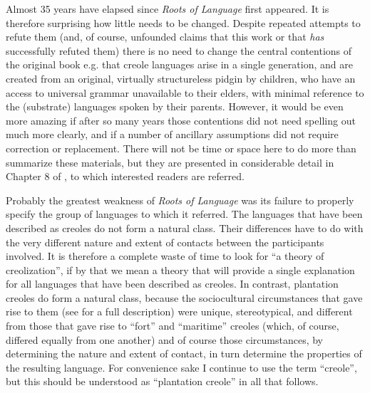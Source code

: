 
Almost 35 years have elapsed since \textit{Roots of Language} first appeared. It is therefore surprising how little needs to be changed. Despite repeated attempts to refute them (and, of course, unfounded claims that this work or that \textit{has} successfully refuted them) there is no need to change the central contentions of the original book e.g. that creole languages arise in a single generation, and are created from an original, virtually structureless pidgin by children, who have an access to universal grammar unavailable to their elders, with minimal reference to the (substrate) languages spoken by their parents. However, it would be even more amazing if after so many years those contentions did not need spelling out much more clearly, and if a number of ancillary assumptions did not require correction or replacement. There will not be time or space here to do more than summarize these materials, but they are presented in considerable detail in Chapter 8 of \citet{Bickerton2014}, to which interested readers are referred.

Probably the greatest weakness of \textit{Roots of Language} was its failure to properly specify the group of languages to which it referred. The languages that have been described as creoles do not form a natural class. Their differences have to do with the very different nature and extent of contacts between the participants involved. It is therefore a complete waste of time to look for “a theory of creolization”, if by that we mean a theory that will provide a single explanation for all languages that have been described as creoles. In contrast, plantation creoles do form a natural class, because the sociocultural circumstances that gave rise to them (see \citealt{Bickerton2006} for a full description) were unique, stereotypical, and different from those that gave rise to “fort” and “maritime” creoles (which, of course, differed equally from one another) and of course those circumstances, by determining the nature and extent of contact, in turn determine the properties of the resulting language. For convenience sake I continue to use the term “creole”, but this should be understood as “plantation creole” in all that follows.

